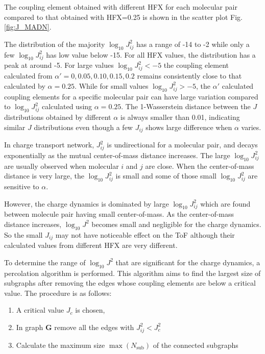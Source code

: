 \documentclass[%
 reprint,
superscriptaddress,
 amsmath,amssymb,
 aps,
prb,
floatfix
]{revtex4-2}
\begin{document}
The coupling element obtained with different HFX for each molecular pair compared to that obtained with HFX=0.25 is shown in the scatter plot Fig. \ref{fig:J_MADN}.


The distribution of the majority $\log_{10} J_{ij}^2$ has a range of -14 to -2 while only a few $\log_{10} J_{ij}^2$ has low value below -15. For all HFX values, the distribution has a peak at around -5. 
For large values $\log_{10} J_{ij}^2 < -5$ the coupling element calculated from $\alpha'=0, 0.05, 0.10, 0.15, 0.2$ remains consistently close to that calculated by $\alpha=0.25$. While for small values $\log_{10} J_{ij}^2 > -5$, the $\alpha'$ calculated coupling elements for a specific molecular pair can have large variation compared to $\log_{10} J_{ij}^2$ calculated using $\alpha=0.25$.
The 1-Wasserstein distance between the $J$ distributions obtained by different $\alpha$ is always smaller than 0.01,  
indicating similar $J$ distributions even though a few $J_{ij}$ shows large difference when $\alpha$ varies. 

In charge transport network, $J_{ij}^2$ is undirectional for a molecular pair, and decays exponentially as the mutual center-of-mass distance increases. The large $\log_{10} J_{ij}^2$ are usually observed when molecular $i$ and $j$ are close.
When the center-of-mass distance is very large, the $\log_{10} J_{ij}^2$ is small and some of those small $\log_{10} J_{ij}^2$ are sensitive to $\alpha$. 

However, the charge dynamics is dominated by large $\log_{10} J_{ij}^2$ which are found between molecule pair having small center-of-mass. As the center-of-mass distance increases, $\log_{10} J^2$ becomes small and negligible for the charge dynamics. So the small $J_{ij}$ may not have noticeable effect on the ToF although their calculated values from different HFX are very different. 

To determine the range of $\log_{10} J^2$ that are significant for the charge dynamics, a percolation algorithm is performed. This algorithm aims to find the largest size of subgraphs after removing the edges whose coupling elements are below a critical value. The procedure is as follows:
\begin{enumerate}
    \item A critical value $J_c$ is chosen,
    \item In graph $\mathbf{G}$ remove all the edges with $J_{ij}^2 < J_c^2$
    \item Calculate the maximum size $\max({N_\text{sub}})$ of the connected subgraphs
\end{enumerate}
\end{document}

